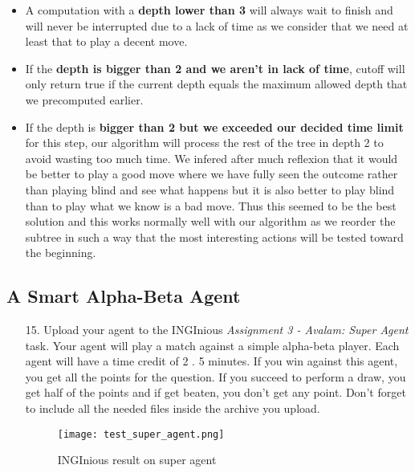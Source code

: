 \begin{enumerate}
\begin{framed}
        \begin{itemize}
            \item A computation with a \textbf{depth lower than 3} will always wait to finish and will never be interrupted due to a lack of time as we consider that we need at least that to play a decent move.
            \item If the \textbf{depth is bigger than 2 and we aren't in lack of time}, cutoff will only return true if the current depth equals the maximum allowed depth that we precomputed earlier.
            \item If the depth is \textbf{bigger than 2 but we exceeded our decided time limit} for this step, our algorithm will process the rest of the tree in depth 2 to avoid wasting too much time. We infered after much reflexion that it would be better to play a good move where we have fully seen the outcome rather than playing blind and see what happens but it is also better to play blind than to play what we know is a bad move. Thus this seemed to be the best solution and this works normally well with our algorithm as we reorder the subtree in such a way that the most interesting actions will be tested toward the beginning.
        \end{itemize}
    \end{framed}
\end{enumerate}

\subsection{A Smart Alpha-Beta Agent}

\begin{enumerate}
    \item[15.] Upload your agent to the INGInious \textit{Assignment 3 - Avalam: Super Agent} task. Your agent will play a match against a simple alpha-beta player. Each agent will have a time credit of 2 . 5 minutes. If you win against this agent, you get all the points for the question. If you succeed to perform a draw, you get half of the points and if get beaten, you don’t get any point. Don’t forget to include all the needed files inside the archive you upload.
    \begin{figure}[!ht]
    \begin{framed}
        \centering
        \texttt{[image: test\_super\_agent.png]}
        \caption{INGInious result on super agent}
    \end{framed}
    \end{figure}
\end{enumerate}

